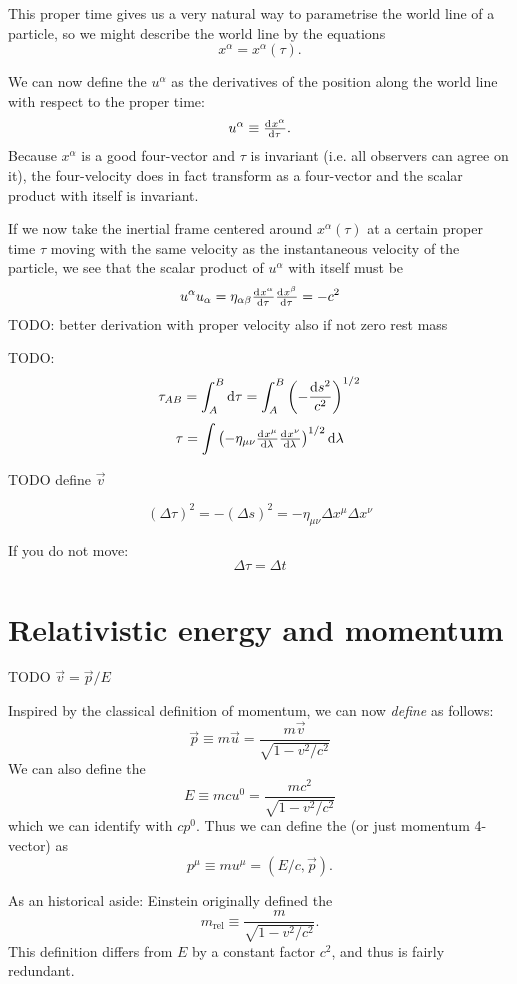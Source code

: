 This proper time gives us a very natural way to parametrise the world line of a particle, so we might describe the world line by the equations
\[ x^\alpha = x^\alpha(\tau). \]

We can now define the  $u^\alpha$ as the derivatives of the position along the world line with respect to the proper time:
\[ u^\alpha \equiv \od{x^\alpha}{\tau}. \]
Because $x^\alpha$ is a good four-vector and $\tau$ is invariant (i.e. all observers can agree on it), the four-velocity does in fact transform as a four-vector and the scalar product with itself is invariant.

If we now take the inertial frame centered around $x^\alpha(\tau)$ at a certain proper time $\tau$ moving with the same velocity as the instantaneous velocity of the particle, we see that the scalar product of $u^\alpha$ with itself must be
\[ u^\alpha u_\alpha = \eta_{\alpha\beta}\od{x^\alpha}{\tau}\od{x^\beta}{\tau} = -c^2 \]
TODO: better derivation with proper velocity also if not zero rest mass


TODO:
\[ \tau_{AB} = \int^B_A \operatorname{d \!}{\tau} = \int^B_A \left(- \frac{\operatorname{d \!}{s}^2}{c^2}\right)^{1/2} \]
\[ \tau = \int \left(-\eta_{\mu\nu}\od{x^\mu}{\lambda}\od{x^\nu}{\lambda}\right)^{1/2}\diff{\lambda} \]

TODO define $\vec{v}$

\[ (\Delta \tau)^2  = - (\Delta s)^2 = -\eta_{\mu\nu}\Delta x^\mu \Delta x^\nu \]

If you do not move:
\[ \Delta \tau = \Delta t \]

\section{Relativistic energy and momentum}
TODO $\vec{v} = \vec{p}/E$

Inspired by the classical definition of momentum, we can now \emph{define}  as follows:
\[ \vec{p} \equiv m\vec{u} = \frac{m\vec{v}}{\sqrt{1-v^2/c^2}} \]
We can also define the 
\[ E \equiv mcu^0 = \frac{mc^2}{\sqrt{1-v^2/c^2}} \]
which we can identify with $cp^0$.
Thus we can define the  (or just momentum 4-vector) as
\[ \boxed{p^\mu \equiv mu^\mu = (E/c, \vec{p})}. \]

As an historical aside: Einstein originally defined the  
\[m_\text{rel} \equiv \frac{m}{\sqrt{1-v^2/c^2}}.\]
This definition differs from $E$ by a constant factor $c^2$, and thus is fairly redundant. 

